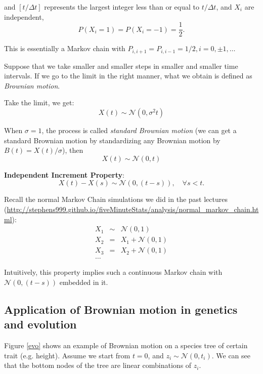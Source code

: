 \documentclass[12pt]{report}
\begin{document}
and $[t / \Delta t]$ represents the largest integer less than or equal to $t / \Delta t$, and $X_i$ are independent,
\begin{equation}
	P(X_i = 1) = P(X_i = -1) = \frac{1}{2}.
\end{equation}

This is essentially a Markov chain with $P_{i, i+1} = P_{i, i-1} = 1/2, i = 0, \pm 1, \ldots$

\vskip 0.1in

Suppose that we take smaller and smaller steps in smaller and smaller time intervals. If we go to the limit in the right manner, what we obtain is defined as \emph{Brownian motion}.

\vskip 0.1in

Take the limit, we get:
\begin{equation}
	X(t) \sim \mathcal{N}(0, \sigma^2 t)
\end{equation}

When $\sigma = 1$, the process is called \emph{standard Brownian motion} (we can get a standard Brownian motion by standardizing any Brownian motion by $B(t) = X(t)/\sigma$), then
\begin{equation}
	X(t) \sim \mathcal{N}(0, t)
\end{equation}

\textbf{Independent Increment Property}:
\begin{equation}
	X(t) - X(s) \sim \mathcal{N}(0, (t-s)), \quad \forall s < t.
\end{equation}

Recall the normal Markov Chain simulations we did in the past lectures (\url{http://stephens999.github.io/fiveMinuteStats/analysis/normal_markov_chain.html}):
\begin{eqnarray*}
	X_1 & \sim & \mathcal{N}(0, 1)\\
	X_2 & = & X_1 + \mathcal{N}(0, 1)\\
	X_3 & = & X_2 + \mathcal{N}(0, 1)\\
	\ldots
\end{eqnarray*}

Intuitively, this property implies such a continuous Markov chain with $\mathcal{N}(0, (t-s))$ embedded in it.

\subsection{Application of Brownian motion in genetics and evolution}

Figure \ref{evo} shows an example of Brownian motion on a species tree of certain trait (e.g. height). Assume we start from $t=0$, and $z_i \sim \mathcal{N}(0, t_i)$. We can see that the bottom nodes of the tree are linear combinations of $z_i$.
\end{document}
